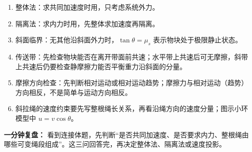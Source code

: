 \begin{enumerate}[nosep]
  \item 整体法：求共同加速度时用，只考虑系统外力。
  \item 隔离法：求内力时用，先整体求加速度再隔离。
  \item 斜面临界：无其他沿斜面外力时，$\tan\theta = \mu_s$ 表示物块处于极限静止状态。
  \item 传送带：先检查物块能否在离开带面前共速；水平带上共速后可无摩擦，斜带上共速后仍要检查静摩擦力能否平衡重力沿斜面的分量。
  \item 摩擦方向检查：先判断相对运动或相对运动趋势；摩擦力与相对运动（趋势）方向相反，不是简单与运动方向相反。
  \item 斜拉绳的速度约束要先写整根绳长关系，再看沿绳方向的速度分量；图示小环模型中 $u=v\cos\theta$。
\end{enumerate}

\textbf{一分钟复盘：} 看到连接体题，先判断“是否共同加速度、是否要求内力、整根绳由哪些可变绳段组成”。这三问回答完，再决定整体法、隔离法或速度投影。
